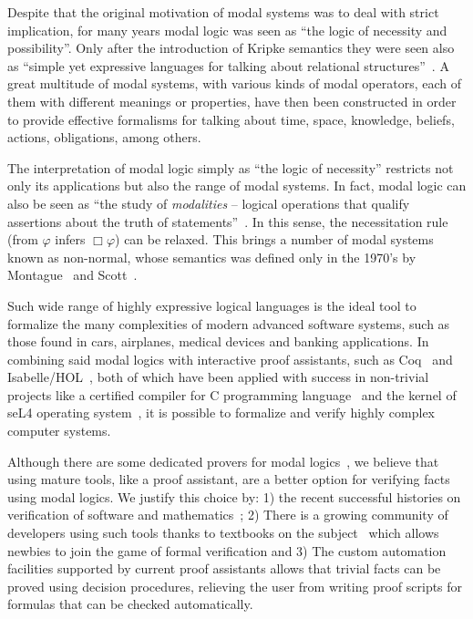 \documentclass[sigconf,anonymous]{acmart}
\begin{document}
Despite that the original motivation of modal systems was to deal with strict implication, 
for many years modal logic was seen as ``the logic of necessity and possibility''. 
Only after the introduction of Kripke semantics they were seen also as ``simple yet
expressive languages for talking about relational structures''~\cite{Blackburn-ModalLogics}. 
A great multitude of modal systems, with various kinds of modal operators, each of them with 
different meanings or properties, have then been constructed in order to provide effective
formalisms for talking about time, space, knowledge, beliefs, actions, 
obligations, among others.

The interpretation of modal logic simply as ``the logic of necessity'' restricts 
not only its applications but also the range of modal systems. In fact, modal logic 
can also be seen as ``the study of \emph{modalities} -- logical operations that qualify 
assertions about the truth of statements''~\cite{Goldblatt-MathofModality}. In this sense, 
the necessitation rule (from $\varphi$ infers $\Box\varphi$) can be relaxed. This brings 
a number of modal systems known as non-normal, whose semantics was defined only in the 
1970's by Montague~\cite{Montague1970} and Scott~\cite{Scott_AdviceModal1970}.

Such wide range of highly expressive logical languages is the ideal tool to 
formalize the many complexities of modern advanced software systems, 
such as those found in cars, airplanes, medical devices and banking applications.
In combining said modal logics with interactive proof assistants,
such as Coq~\cite{manual_coq} and Isabelle/HOL~\cite{manual_isabelle}, both of
which have been applied with success in non-trivial projects like a certified compiler 
for C programming language~\cite{Leroy09} and the kernel of seL4 operating
system~\cite{Klein10}, it is possible to formalize and verify highly complex computer
systems.

Although there are some dedicated provers for modal logics~\cite{Gleissner17,Mora11},
we believe that using mature tools, like a proof assistant, are a better option for
verifying facts using modal logics. We justify this choice by: 1) the recent
successful histories on verification of software and
mathematics~\cite{Leroy09,Klein10,Gonthier13,Gonthier08}; 2) There is a growing
community of developers using such tools thanks to 
textbooks on the subject~\cite{Nipkow14,Bertot10,Chlipala13} which allows
newbies to join the game of formal verification and 3) The custom automation
facilities supported by current proof assistants allows that trivial facts can
be proved using decision procedures, relieving the user from writing proof
scripts for formulas that can be checked automatically.
\end{document}

